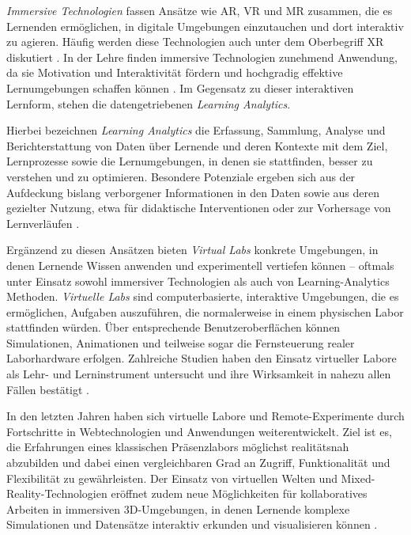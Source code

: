 \textit{Immersive Technologien} fassen Ansätze wie \ac{AR}, \ac{VR} und \ac{MR} zusammen, die es Lernenden ermöglichen, in digitale Umgebungen einzutauchen und dort interaktiv zu agieren. Häufig werden diese Technologien auch unter dem Oberbegriff \ac{XR} diskutiert \parencites[S.~82]{alnagrat_review_2022}[S.~256]{chen_information_2024}. In der Lehre finden immersive Technologien zunehmend Anwendung, da sie Motivation und Interaktivität fördern und hochgradig effektive Lernumgebungen schaffen können \parencite[S.~1]{izouaouen_education_2025}. Im Gegensatz zu dieser interaktiven Lernform, stehen die datengetriebenen \textit{Learning Analytics}.

Hierbei bezeichnen \textit{Learning Analytics} die Erfassung, Sammlung, Analyse und Berichterstattung von Daten über Lernende und deren Kontexte mit dem Ziel, Lernprozesse sowie die Lernumgebungen, in denen sie stattfinden, besser zu verstehen und zu optimieren. Besondere Potenziale ergeben sich aus der Aufdeckung bislang verborgener Informationen in den Daten sowie aus deren gezielter Nutzung, etwa für didaktische Interventionen oder zur Vorhersage von Lernverläufen \parencite[S.~294]{xiao_applying_2019}.

Ergänzend zu diesen Ansätzen bieten \textit{Virtual Labs} konkrete Umgebungen, in denen Lernende Wissen anwenden und experimentell vertiefen können – oftmals unter Einsatz sowohl immersiver Technologien als auch von Learning-Analytics Methoden. \textit{Virtuelle Labs} sind computerbasierte, interaktive Umgebungen, die es ermöglichen, Aufgaben auszuführen, die normalerweise in einem physischen Labor stattfinden würden. Über entsprechende Benutzeroberflächen können Simulationen, Animationen und teilweise sogar die Fernsteuerung realer Laborhardware erfolgen. Zahlreiche Studien haben den Einsatz virtueller Labore als Lehr- und Lerninstrument untersucht und ihre Wirksamkeit in nahezu allen Fällen bestätigt \parencite[S.~117]{achuthan_value_2011}.

In den letzten Jahren haben sich virtuelle Labore und Remote-Experimente durch Fortschritte in Webtechnologien und Anwendungen weiterentwickelt. Ziel ist es, die Erfahrungen eines klassischen Präsenzlabors möglichst realitätsnah abzubilden und dabei einen vergleichbaren Grad an Zugriff, Funktionalität und Flexibilität zu gewährleisten. Der Einsatz von virtuellen Welten und Mixed-Reality-Technologien eröffnet zudem neue Möglichkeiten für kollaboratives Arbeiten in immersiven 3D-Umgebungen, in denen Lernende komplexe Simulationen und Datensätze interaktiv erkunden und visualisieren können \parencite[S.~1]{savin-baden_understanding_2012}.

